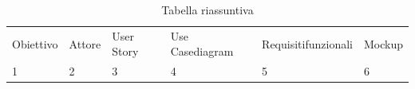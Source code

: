 \documentclass{article}
\begin{document}
\begin{table}[htbp]
    \centering
    \begin{tabularx}{\textwidth}{|X|X|X|X|X|X|}
        \Xhline{2pt} %
        Obiettivo & Attore & User Story & Use Case\newline diagram & Requisiti\newline funzionali & Mockup \\
        \Xhline{2pt} %
        1 & 2 & 3 & 4 & 5 & 6 \\
        \hline
    \end{tabularx}
    \caption{Tabella riassuntiva}
    \label{tab:tabella_tutta_pagina}
\end{table}
\end{document}
